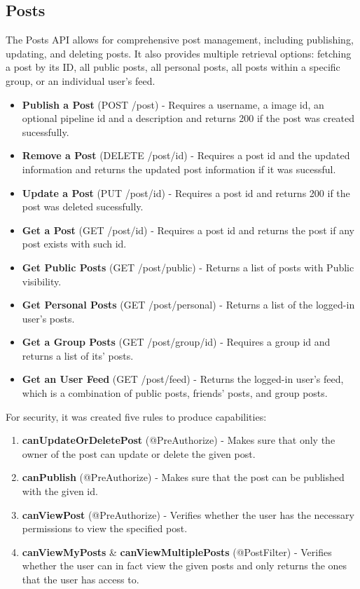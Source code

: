 \documentclass[acmart, nonacm]{acmart}
\begin{document}
\subsection{Posts}
The Posts API allows for comprehensive post management, including publishing, updating, and deleting posts. It also provides multiple retrieval options: fetching a post by its ID, 
all public posts, all personal posts, all posts within a specific group, or an individual user's feed.
\begin{itemize}
    \item \textbf{Publish a Post} (POST /post) - Requires a username, a image id, an optional pipeline id and a description and returns 200 if the post was created sucessfully.
    \item \textbf{Remove a Post} (DELETE /post/{id}) - Requires a post id and the updated information and returns the updated post information if it was sucessful.
    \item \textbf{Update a Post} (PUT /post/{id}) - Requires a post id and returns 200 if the post was deleted sucessfully.
    \item \textbf{Get a Post} (GET /post/{id}) - Requires a post id and returns the post if any post exists with such id.
    \item \textbf{Get Public Posts} (GET /post/public) - Returns a list of posts with Public visibility.
    \item \textbf{Get Personal Posts} (GET /post/personal) - Returns a list of the logged-in user's posts.
    \item \textbf{Get a Group Posts} (GET /post/group/{id}) - Requires a group id and returns a list of its' posts.
    \item \textbf{Get an User Feed} (GET /post/feed) - Returns the logged-in user's feed, which is a combination of public posts, friends' posts, and group posts.
\end{itemize}

For security, it was created five rules to produce capabilities:
\begin{enumerate}
    \item \textbf{canUpdateOrDeletePost} (@PreAuthorize) - Makes sure that only the owner of the post can update or delete the given post.
    \item \textbf{canPublish} (@PreAuthorize) - Makes sure that the post can be published with the given id.
    \item \textbf{canViewPost} (@PreAuthorize) - Verifies whether the user has the necessary permissions to view the specified post.
    \item \textbf{canViewMyPosts} \& \textbf{canViewMultiplePosts} (@PostFilter) - Verifies whether the user can in fact view the given posts and only returns the ones that the user has 
    access to.
\end{enumerate}
\end{document}
